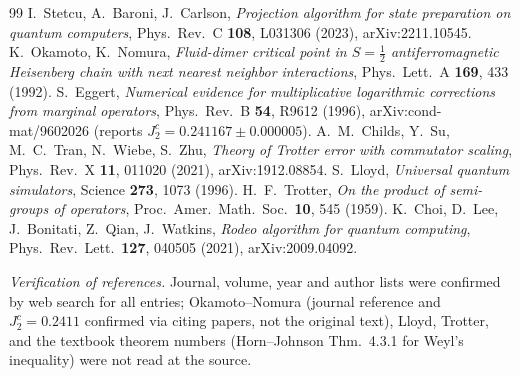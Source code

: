 \documentclass[11pt]{article}
\theoremstyle{definition}
\begin{document}
\begin{thebibliography}{99}
 I.~Stetcu, A.~Baroni, J.~Carlson, \emph{Projection algorithm for state preparation on quantum computers},
  Phys.\ Rev.\ C \textbf{108}, L031306 (2023), arXiv:2211.10545.
 K.~Okamoto, K.~Nomura, \emph{Fluid-dimer critical point in $S=\tfrac12$ antiferromagnetic Heisenberg chain with
  next nearest neighbor interactions}, Phys.\ Lett.\ A \textbf{169}, 433 (1992).
 S.~Eggert, \emph{Numerical evidence for multiplicative logarithmic corrections from marginal operators},
  Phys.\ Rev.\ B \textbf{54}, R9612 (1996), arXiv:cond-mat/9602026 (reports $J_2^c=0.241167\pm0.000005$).
 A.~M.~Childs, Y.~Su, M.~C.~Tran, N.~Wiebe, S.~Zhu, \emph{Theory of Trotter error with commutator scaling},
  Phys.\ Rev.\ X \textbf{11}, 011020 (2021), arXiv:1912.08854.
 S.~Lloyd, \emph{Universal quantum simulators}, Science \textbf{273}, 1073 (1996).
 H.~F.~Trotter, \emph{On the product of semi-groups of operators}, Proc.\ Amer.\ Math.\ Soc.\ \textbf{10}, 545 (1959).
 K.~Choi, D.~Lee, J.~Bonitati, Z.~Qian, J.~Watkins, \emph{Rodeo algorithm for quantum computing},
  Phys.\ Rev.\ Lett.\ \textbf{127}, 040505 (2021), arXiv:2009.04092.
\end{thebibliography}

\noindent\emph{Verification of references.} Journal, volume, year and author lists were confirmed by web search for all entries; Okamoto--Nomura (journal reference and $J_2^c=0.2411$ confirmed via citing papers, not the original text), Lloyd, Trotter, and the
textbook theorem numbers (Horn--Johnson Thm.~4.3.1 for Weyl's inequality) were not read at the source.
\end{document}
